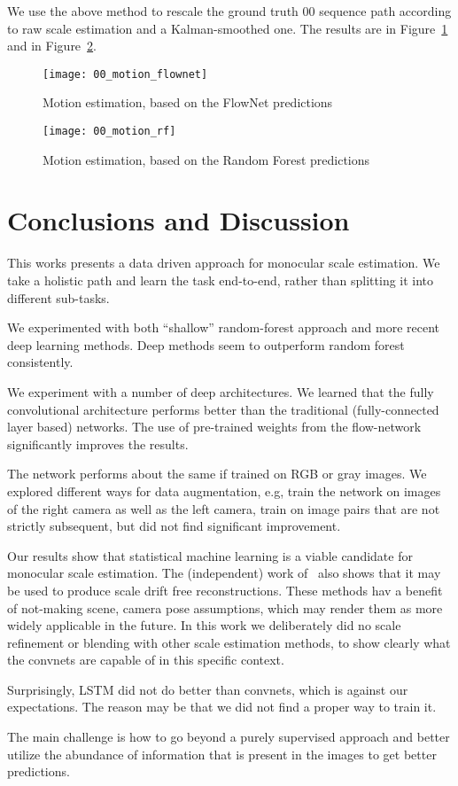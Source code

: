 We use the above method to rescale the ground truth 00 sequence path
according to raw scale estimation and a Kalman-smoothed one.  The
results are in Figure~\ref{fig:00_motion} and in
Figure~\ref{fig:00_motion_rf}.
\begin{figure}[!ht]
  \centering
  \texttt{[image: 00\_motion\_flownet]}
  \caption{Motion estimation, based on the FlowNet predictions}
  \label{fig:00_motion}
\end{figure}

\begin{figure}[!ht]
  \centering
  \texttt{[image: 00\_motion\_rf]}
  \caption{Motion estimation, based on the Random Forest predictions}
  \label{fig:00_motion_rf}
\end{figure}

\section{Conclusions and Discussion}

This works presents a data driven approach for monocular scale
estimation.  We take a holistic path and learn the task end-to-end,
rather than splitting it into different sub-tasks.

We experimented with both ``shallow'' random-forest approach and more
recent deep learning methods.  Deep methods seem to outperform random
forest consistently.

We experiment with a number of deep architectures. We learned that the
fully convolutional architecture performs better than the traditional
(fully-connected layer based) networks.  The use of pre-trained weights
from the flow-network significantly improves the results.

The network performs about the same if trained on RGB or gray images.
We explored different ways for data augmentation, e.g, train the
network on images of the right camera as well as the left camera,
train on image pairs that are not strictly subsequent, but did not
find significant improvement.

Our results show that statistical machine learning is a viable
candidate for monocular scale estimation.  The (independent) work
of~\cite{frost2017using} also shows that it may be used to produce scale
drift free reconstructions.  These methods hav a benefit of not-making
scene, camera pose assumptions, which may render them as more widely
applicable in the future.  In this work we deliberately did no scale
refinement or blending with other scale estimation methods, to show
clearly what the convnets are capable of in this specific context.

Surprisingly, LSTM did not do better than convnets, which is against
our expectations. The reason may be that we did not find a proper way
to train it.

The main challenge is how to go beyond a purely supervised approach
and better utilize the abundance of information that is present in the
images to get better predictions.

